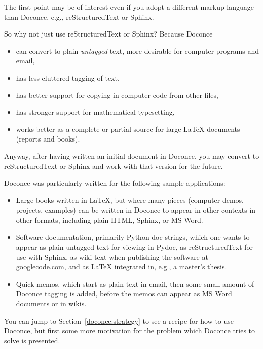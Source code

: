 \documentclass{article}
\begin{document}
\noindent
The first point may be of interest even if you adopt a different
markup language than Doconce, e.g., reStructuredText or Sphinx.

So why not just use reStructuredText or Sphinx? Because Doconce

\begin{itemize}
  \item can convert to plain \emph{untagged} text, 
    more desirable for computer programs and email, 

  \item has less cluttered tagging of text,

  \item has better support for copying in computer code from other files,

  \item has stronger support for mathematical typesetting,

  \item works better as a complete or partial source for large {\LaTeX} 
    documents (reports and books).
\end{itemize}

\noindent
Anyway, after having written an initial document in Doconce, you may
convert to reStructuredText or Sphinx and work with that version for
the future.

Doconce was particularly written for the following sample applications:

\begin{itemize}
  \item Large books written in {\LaTeX}, but where many pieces (computer demos,
    projects, examples) can be written in Doconce to appear in other
    contexts in other formats, including plain HTML, Sphinx, or MS Word.

  \item Software documentation, primarily Python doc strings, which one wants
    to appear as plain untagged text for viewing in Pydoc, as reStructuredText
    for use with Sphinx, as wiki text when publishing the software at
    googlecode.com, and as {\LaTeX} integrated in, e.g., a master's thesis.

  \item Quick memos, which start as plain text in email, then some small
    amount of Doconce tagging is added, before the memos can appear as
    MS Word documents or in wikis.
\end{itemize}

\noindent
You can jump to Section~\ref{doconce:strategy} to see a recipe for
how to use Doconce, but first some more motivation for
the problem which Doconce tries to solve is presented.
\end{document}
